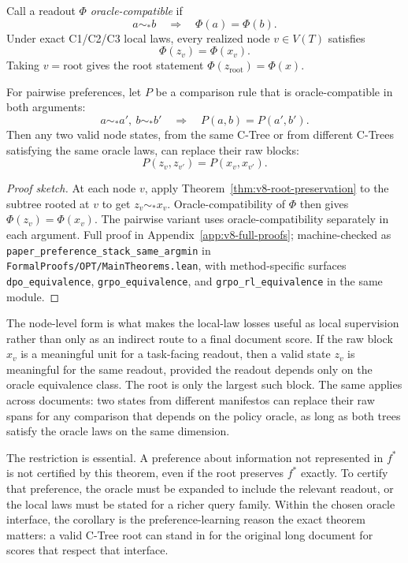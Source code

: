 \begin{corollary}
\label{cor:v8-preferences-pass-to-root}
Call a readout \(\Phi\) \emph{oracle-compatible} if
\[
  a\sim_\ast b \quad\Longrightarrow\quad \Phi(a)=\Phi(b).
\]
Under exact C1/C2/C3 local laws, every realized node \(v\in V(T)\) satisfies
\[
  \Phi(z_v)=\Phi(x_v).
\]
Taking \(v=\mathrm{root}\) gives the root statement
\(\Phi(z_{\mathrm{root}})=\Phi(x)\).

For pairwise preferences, let \(P\) be a comparison rule that is
oracle-compatible in both arguments:
\[
  a\sim_\ast a',\ b\sim_\ast b'
  \quad\Longrightarrow\quad
  P(a,b)=P(a',b').
\]
Then any two valid node states, from the same C-Tree or from different
C-Trees satisfying the same oracle laws, can replace their raw blocks:
\[
  P(z_v,z_{v'})=P(x_v,x_{v'}).
\]
\end{corollary}

\begin{proof}[Proof sketch]
At each node \(v\), apply Theorem~\ref{thm:v8-root-preservation} to
the subtree rooted at \(v\) to get \(z_v\sim_\ast x_v\).
Oracle-compatibility of \(\Phi\) then gives
\(\Phi(z_v)=\Phi(x_v)\). The pairwise variant uses
oracle-compatibility separately in each argument. Full proof in
Appendix~\ref{app:v8-full-proofs}; machine-checked as
\texttt{paper\_preference\_stack\_same\_argmin} in
\texttt{FormalProofs/OPT/MainTheorems.lean}, with method-specific
surfaces \texttt{dpo\_equivalence}, \texttt{grpo\_equivalence}, and
\texttt{grpo\_rl\_equivalence} in the same module.
\end{proof}

The node-level form is what makes the local-law losses useful as local
supervision rather than only as an indirect route to a final document score. If
the raw block \(x_v\) is a meaningful unit for a task-facing readout, then a
valid state \(z_v\) is meaningful for the same readout, provided the readout
depends only on the oracle equivalence class. The root is only the largest
such block. The same applies across documents: two states from
different manifestos can replace their raw spans for any comparison
that depends on the policy oracle, as long as both trees satisfy the
oracle laws on the same dimension.

The restriction is essential. A preference about information not represented in
\(f^\ast\) is not certified by this theorem, even if the root preserves
\(f^\ast\) exactly. To certify that preference, the oracle must be expanded to
include the relevant readout, or the local laws must be stated for a richer
query family. Within the chosen oracle interface, the corollary is the
preference-learning reason the exact theorem matters: a valid C-Tree root can
stand in for the original long document for scores that respect that interface.

